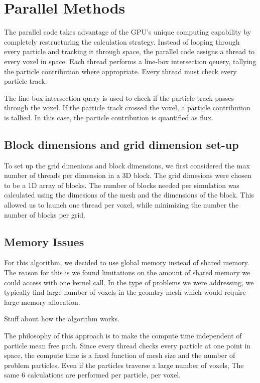 \section{Parallel Methods}
The parallel code takes advantage of the GPU's unique computing capability by
completely restructuring the calculation strategy. Instead of looping through
every particle and tracking it through space, the parallel code assigns a thread
to every voxel in space. Each thread performs a line-box intersection qeuery,
tallying the particle contribution where appropriate. Every thread must check
every particle track. 

The line-box intersection query is used to check if the particle track passes 
through the voxel. If the particle track crossed the voxel, a particle contribution 
is tallied. In this case, the particle contribution is quantified as flux. 

\subsection{Block dimensions and grid dimension set-up}
To set up the grid dimenions and block dimensions, we first considered the max number of 
threads per dimension in a 3D block. 
The grid dimesions were chosen to be a 1D array of blocks. The number of blocks 
needed per simulation was calculated using the dimesions of the mesh and the 
dimensions of the block. This allowed us to launch one thread per voxel, while 
minimizing the number the number of blocks per grid. 

\subsection{Memory Issues}
For this algorithm, we decided to use global memory instead of shared memory. 
The reason for this is we found limitations on the amount of shared memory we 
could access with one kernel call. In the type of problems we were addressing, 
we typically find large number of voxels in the geomtry mesh which would require 
large memory allocation. 
 
 
Stuff about how the algorithm works.

The philosophy of this approach is to make the compute time independent of
particle mean free path. Since every thread checks every particle at one point
in space, the compute time is a fixed function of mesh size and the number of
problem particles. Even if the particles traverse a large number of voxels, The
same 6 calculations are performed per particle, per voxel.

